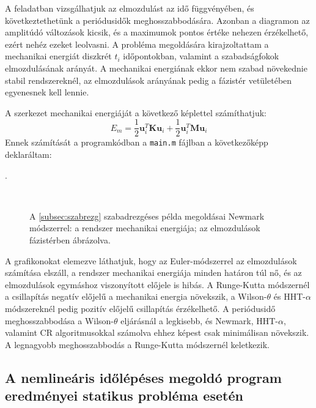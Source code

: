  A feladatban vizsgálhatjuk az elmozdulást az idő függvényében, és  következtethetünk a periódusidők meghosszabbodására. Azonban a diagramon az amplitúdó változások kicsik,  és a maximumok pontos értéke nehezen érzékelhető, ezért   nehéz ezeket  leolvasni.  A probléma megoldására kirajzoltattam  a mechanikai energiát diszkrét $t_i$ időpontokban, valamint a szabadságfokok elmozdulásának arányát. A mechanikai energiának ekkor nem szabad növekednie stabil rendszereknél, az elmozdulások arányának pedig a fázistér vetületében egyenesnek kell lennie.  
 
A szerkezet mechanikai energiáját a következő képlettel számíthatjuk:
\[ E_m = \frac{1}{2}\mathbf{u}_i^T\mathbf{K}\mathbf{u}_i+\frac{1}{2}\mathbf{u}_i^T\mathbf{M}\mathbf{u}_i\]
Ennek számítását a programkódban a  \verb|main.m| fájlban a következőképp deklaráltam:

  .
  

\begin{figure}[h!b]%
\centering
{}%
\\
%
\caption[A \ref{subsec:szabrezg} szabadrezgéses példa megoldásai Newmark módszerrel.]{A \ref{subsec:szabrezg} szabadrezgéses példa megoldásai  Newmark módszerrel:
 a rendszer mechanikai energiája;
 az elmozdulások fázistérben ábrázolva.}%
\label{fig:szabrezg_erek_newmark}
\end{figure}


 A grafikonokat elemezve láthatjuk, hogy az Euler-módszerrel az elmozdulások számítása elszáll, a rendszer mechanikai energiája minden határon túl nő, és az elmozdulások egymáshoz viszonyított előjele is hibás. A Runge-Kutta módszernél a csillapítás negatív előjelű a mechanikai energia növekszik, a Wilson-$\theta$ és HHT-$\alpha$ módszereknél pedig pozitív előjelű csillapítás érzékelhető. A periódusidő meghosszabbodása a Wilson-$\theta$ eljárásnál a legkisebb, és  Newmark,  HHT-$\alpha$, valamint CR algoritmusokkal számolva ehhez képest csak minimálisan növekszik. A legnagyobb meghosszabbodás a Runge-Kutta módszernél keletkezik.
 





\subsection{A nemlineáris időlépéses megoldó program eredményei statikus  probléma esetén}\label{subsec: nemlin eredmény stat}


